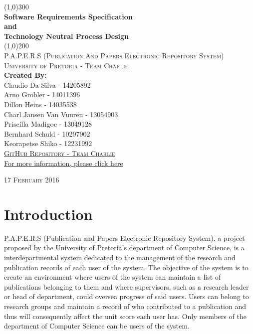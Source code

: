 \documentclass{article}
\begin{document}
	\begin{titlepage}
		\begin{center}
		
			\line(1,0){300}\\
			[6mm]
			\huge{
				\bfseries Software Requirements Specification\\
				and\\
				Technology Neutral Process Design
			}\\
			[2mm]
			\line(1,0){200}\\
			[15mm]
			\textsc{\large P.A.P.E.R.S (Publication And Papers Electronic Repository System)}\\
			[7.5mm]
			\textsc{\large University of Pretoria - Team Charlie}\\
			[20mm]
			\large{\textbf{Created By:}}\\
			[2mm]
			\large{
				Claudio Da Silva - 14205892\\
				Arno Grobler - 14011396\\
				Dillon Heins - 14035538\\
				Charl Jansen Van Vuuren - 13054903\\
				Priscilla Madigoe - 13049128\\
				Bernhard Schuld - 10297902\\
				Keorapetse Shiko - 12231992
			}\\
			[4cm]

		\href{https://github.com/DillonHeins/Charlie}{\textsc{\Large GitHub Repository - Team Charlie}\\[2mm]
		  For more information, please click here}
			
		\end{center}	
		\begin{flushright}
			\textsc{\large 17 February 2016}
		\end{flushright}
	\end{titlepage}
	
	\cleardoublepage
	\thispagestyle{empty}
	\tableofcontents
	\cleardoublepage
	\listoffigures
	\cleardoublepage
	\setcounter{page}{1}
	\section{Introduction}\label{sec:intro}
	P.A.P.E.R.S (Publication and Papers Electronic Repository System), a project proposed by the University of Pretoria’s department of Computer Science, is a interdepartmental system dedicated to the management of the research and publication records of each user of the system. The objective of the system is to create an environment where users of the system can maintain a list of publications belonging to them and where supervisors, such as a research leader or head of department, could oversea progress of said users. Users can belong to research groups and maintain a record of who contributed to a publication and thus will consequently affect the unit score each user has. Only members of the department of Computer Science can be users of the system. 
	
\end{document}
